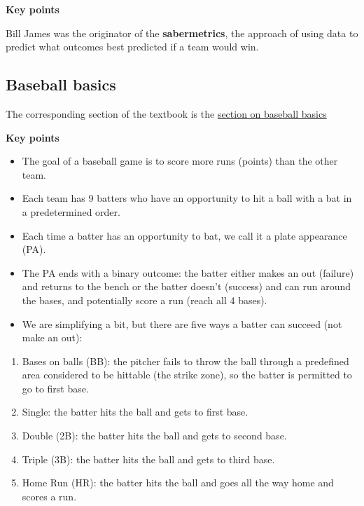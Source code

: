 \documentclass[
]{article}
\providecommand{\tightlist}{%
  \setlength{\itemsep}{0pt}\setlength{\parskip}{0pt}}
\begin{document}
\textbf{Key points}

Bill James was the originator of the \textbf{sabermetrics}, the approach
of using data to predict what outcomes best predicted if a team would
win.

\hypertarget{baseball-basics}{%
\subsection{Baseball basics}\label{baseball-basics}}

The corresponding section of the textbook is the
\href{https://rafalab.github.io/dsbook/linear-models.html\#baseball-basics}{section
on baseball basics}

\textbf{Key points}

\begin{itemize}
\tightlist
\item
  The goal of a baseball game is to score more runs (points) than the
  other team.
\item
  Each team has 9 batters who have an opportunity to hit a ball with a
  bat in a predetermined order.
\item
  Each time a batter has an opportunity to bat, we call it a plate
  appearance (PA).
\item
  The PA ends with a binary outcome: the batter either makes an out
  (failure) and returns to the bench or the batter doesn't (success) and
  can run around the bases, and potentially score a run (reach all 4
  bases).
\item
  We are simplifying a bit, but there are five ways a batter can succeed
  (not make an out):
\end{itemize}

\begin{enumerate}
\def\labelenumi{\arabic{enumi}.}
\tightlist
\item
  Bases on balls (BB): the pitcher fails to throw the ball through a
  predefined area considered to be hittable (the strike zone), so the
  batter is permitted to go to first base.
\item
  Single: the batter hits the ball and gets to first base.
\item
  Double (2B): the batter hits the ball and gets to second base.
\item
  Triple (3B): the batter hits the ball and gets to third base.
\item
  Home Run (HR): the batter hits the ball and goes all the way home and
  scores a run.
\end{enumerate}
\end{document}

